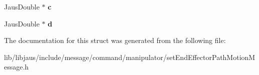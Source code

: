 \begin{DoxyCompactItemize}
\item 
\hypertarget{struct_set_end_effector_path_motion_message_struct_a3ca8a74ae37f18e2bd38cbb57311e555}{\-Jaus\-Double $\ast$ {\bfseries c}}\label{struct_set_end_effector_path_motion_message_struct_a3ca8a74ae37f18e2bd38cbb57311e555}

\item 
\hypertarget{struct_set_end_effector_path_motion_message_struct_a798aa5b7dfbb1de50290e1f15e138ae2}{\-Jaus\-Double $\ast$ {\bfseries d}}\label{struct_set_end_effector_path_motion_message_struct_a798aa5b7dfbb1de50290e1f15e138ae2}

\end{DoxyCompactItemize}


\-The documentation for this struct was generated from the following file\-:\begin{DoxyCompactItemize}
\item 
lib/libjaus/include/message/command/manipulator/set\-End\-Effector\-Path\-Motion\-Message.\-h\end{DoxyCompactItemize}
